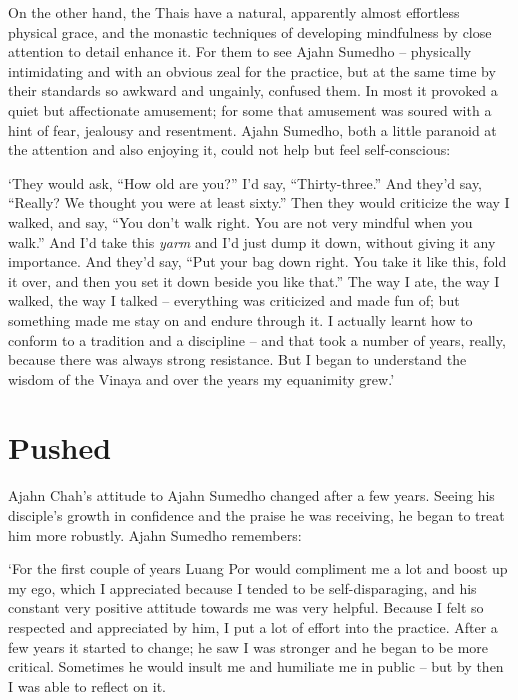 On the other hand, the Thais have a natural, apparently almost
effortless physical grace, and the monastic techniques of developing
mindfulness by close attention to detail enhance it. For them to see
Ajahn Sumedho -- physically intimidating and with an obvious zeal for
the practice, but at the same time by their standards so awkward and
ungainly, confused them. In most it provoked a quiet but affectionate
amusement; for some that amusement was soured with a hint of fear, 
jealousy and resentment. Ajahn Sumedho, both a little paranoid at the
attention and also enjoying it, could not help but feel self-conscious: 

`They would ask, ``How old are you?'' I'd say, ``Thirty-three.'' And
they'd say, ``Really? We thought you were at least sixty.'' Then they
would criticize the way I walked, and say, ``You don't walk right. You
are not very mindful when you walk.'' And I'd take this \emph{yarm} and
I'd just dump it down, without giving it any importance. And they'd say, 
``Put your bag down right. You take it like this, fold it over, and then
you set it down beside you like that.'' The way I ate, the way I walked, 
the way I talked -- everything was criticized and made fun of; but
something made me stay on and endure through it. I actually learnt how
to conform to a tradition and a discipline -- and that took a number of
years, really, because there was always strong resistance. But I began
to understand the wisdom of the Vinaya and over the years my equanimity
grew.'

\section{Pushed}

Ajahn Chah's attitude to Ajahn Sumedho changed after a few years. Seeing
his disciple's growth in confidence and the praise he was receiving, he
began to treat him more robustly. Ajahn Sumedho remembers: 

`For the first couple of years Luang Por would compliment me a lot and
boost up my ego, which I appreciated because I tended to be
self-disparaging, and his constant very positive attitude towards me was
very helpful. Because I felt so respected and appreciated by him, I put
a lot of effort into the practice. After a few years it started to
change; he saw I was stronger and he began to be more critical. 
Sometimes he would insult me and humiliate me in public -- but by then
I was able to reflect on it. 


